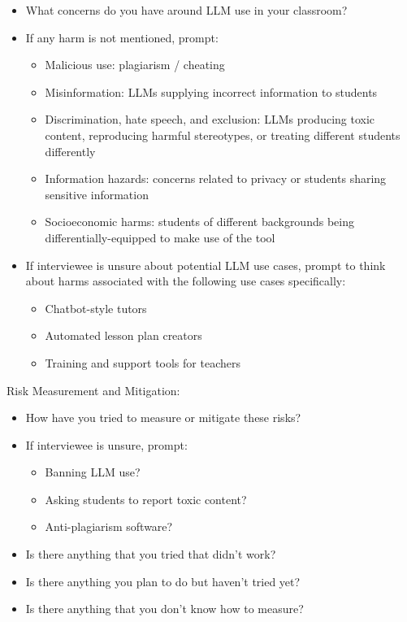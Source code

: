\begin{itemize}
    \item What concerns do you have around LLM use in your classroom? 
    \item If any harm is not mentioned, prompt: 
    \begin{itemize}
        \item Malicious use: plagiarism / cheating
        \item Misinformation: LLMs supplying incorrect information to students
        \item Discrimination, hate speech, and exclusion: LLMs producing toxic content, reproducing harmful stereotypes, or treating different students differently
        \item Information hazards: concerns related to privacy or students sharing sensitive information
        \item Socioeconomic harms: students of different backgrounds being differentially-equipped to make use of the tool    \end{itemize}
    \item If interviewee is unsure about potential LLM use cases, prompt to think about harms associated with the following use cases specifically:
    \begin{itemize}
        \item Chatbot-style tutors
        \item Automated lesson plan creators
        \item Training and support tools for teachers
    \end{itemize}
\end{itemize}

Risk Measurement and Mitigation: 
\begin{itemize}
    \item How have you tried to measure or mitigate these risks? 
    \item If interviewee is unsure, prompt: 
    \begin{itemize}
        \item Banning LLM use?
        \item Asking students to report toxic content? 
        \item Anti-plagiarism software? 
    \end{itemize}
    \item Is there anything that you tried that didn’t work?
    \item Is there anything you plan to do but haven’t tried yet? 
    \item Is there anything that you don’t know how to measure? 
\end{itemize}

